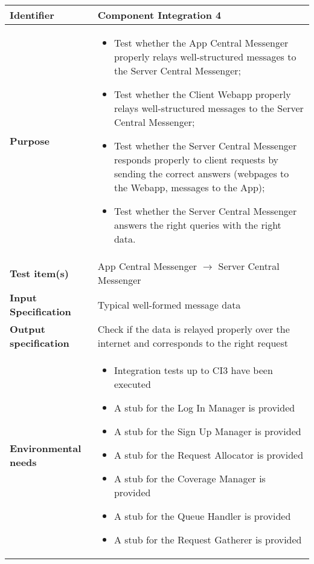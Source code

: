 \begin{center}
\begin{tabular}{lp{}}
\toprule
\textbf{Identifier}		&	Component Integration 4\\
\midrule
\textbf{Purpose}		&	\begin{itemize}
					\item Test whether the App Central Messenger properly relays well-structured messages to the Server Central Messenger;
					\item Test whether the Client Webapp properly relays well-structured messages to the Server Central Messenger;
					\item Test whether the Server Central Messenger responds properly to client requests by sending the correct answers (webpages to the Webapp, messages to the App);
					\item Test whether the Server Central Messenger answers the right queries with the right data.
					\end{itemize}	\\
\textbf{Test item(s)}	&	App Central Messenger $\rightarrow$ Server Central Messenger\\

\textbf{Input Specification}	&	Typical well-formed message data\\
\textbf{Output specification}	&	Check if the data is relayed properly over the internet and corresponds to the right request\\
\textbf{Environmental needs}	&	\begin{itemize}
							\item Integration tests up to CI3 have been executed
							\item A stub for the Log In Manager is provided
							\item A stub for the Sign Up Manager is provided
							\item A stub for the Request Allocator is provided
							\item A stub for the Coverage Manager is provided
							\item A stub for the Queue Handler is provided
							\item A stub for the Request Gatherer is provided
							\end{itemize}	\\
\bottomrule
\end{tabular}
\end{center}


